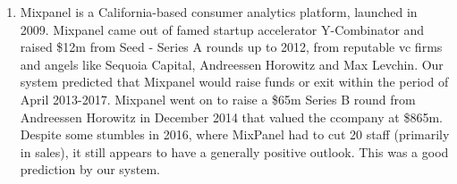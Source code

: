 \documentclass[../thesis/thesis.tex]{subfiles}
\begin{document}
\begin{enumerate}
\item Mixpanel is a California-based consumer analytics platform, launched in 2009. Mixpanel came out of famed startup accelerator Y-Combinator and raised \$12m from Seed - Series A rounds up to 2012, from reputable \gls{vc} firms and angels like Sequoia Capital, Andreessen Horowitz and Max Levchin. Our system predicted that Mixpanel would raise funds or exit within the period of April 2013-2017.  Mixpanel went on to raise a \$65m Series B round from Andreessen Horowitz in December 2014 that valued the ccompany at \$865m. Despite some stumbles in 2016, where MixPanel had to cut 20 staff (primarily in sales), it still appears to have a generally positive outlook. This was a good prediction by our system.

\end{enumerate}

\end{document}
